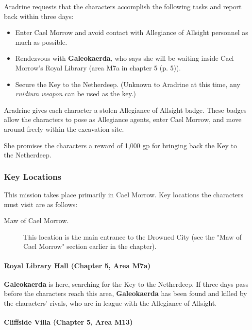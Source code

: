 \documentclass[letterpaper, 11pt, bg=full, twocolumn]{dndbook}
\begin{document}
Aradrine requests that the characters accomplish the following tasks and report back within three days:

\begin{itemize}
\item Enter Cael Morrow and avoid contact with Allegiance of Allsight personnel as much as possible.
\item Rendezvous with \textbf{Galeokaerda}, who says she will be waiting inside Cael Morrow's Royal Library (area M7a in chapter 5 (p. 5)).
\item Secure the Key to the Netherdeep. (Unknown to Aradrine at this time, any \textit{ruidium weapon} can be used as the key.)
\end{itemize}

Aradrine gives each character a stolen Allegiance of Allsight badge. These badges allow the characters to pose as Allegiance agents, enter Cael Morrow, and move around freely within the excavation site.

She promises the characters a reward of 1,000 gp for bringing back the Key to the Netherdeep.

\subsubsection{Key Locations}

This mission takes place primarily in Cael Morrow. Key locations the characters must visit are as follows:

\begin{description}
\item[Maw of Cael Morrow.] This location is the main entrance to the Drowned City (see the "Maw of Cael Morrow" section earlier in the chapter).
\end{description}

\paragraph{Royal Library Hall (Chapter 5, Area M7a)}

\textbf{Galeokaerda} is here, searching for the Key to the Netherdeep. If three days pass before the characters reach this area, \textbf{Galeokaerda} has been found and killed by the characters' rivals, who are in league with the Allegiance of Allsight.

\paragraph{Cliffside Villa (Chapter 5, Area M13)}
\end{document}
